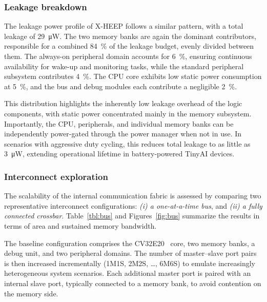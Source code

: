             \vspace{-1em}
            \subsubsection*{Leakage breakdown}
        
                The leakage power profile of \mbox{X-HEEP} follows a similar pattern, with a total leakage of \SI{29}{\micro\watt}. The two memory banks are again the dominant contributors, responsible for a combined \SI{84}{\percent} of the leakage budget, evenly divided between them. The always-on peripheral domain accounts for \SI{6}{\percent}, ensuring continuous availability for wake-up and monitoring tasks, while the standard peripheral subsystem contributes \SI{4}{\percent}. The CPU core exhibits low static power consumption at \SI{5}{\percent}, and the bus and debug modules each contribute a negligible \SI{2}{\percent}.
        
                This distribution highlights the inherently low leakage overhead of the logic components, with static power concentrated mainly in the memory subsystem. Importantly, the CPU, peripherals, and individual memory banks can be independently power-gated through the power manager when not in use. In scenarios with aggressive duty cycling, this reduces total leakage to as little as \SI{3}{\micro\watt}, extending operational lifetime in battery-powered TinyAI devices.

            \vspace{-1em}
            \subsubsection*{Interconnect exploration}
            
                The scalability of the internal communication fabric is assessed by comparing two representative interconnect configurations: \emph{(i) a one-at-a-time bus}, and  
                \emph{(ii) a fully connected crossbar}. Table~\ref{tbl:bus} and Figures~\ref{fig:bus} summarize the results in terms of area and sustained memory bandwidth.
        
                The baseline configuration comprises the CV32E20~\cite{zeroriscy} core, two memory banks, a debug unit, and two peripheral domains. The number of master–slave port pairs is then increased incrementally (1M1S, 2M2S, …, 6M6S) to emulate increasingly heterogeneous system scenarios. Each additional master port is paired with an internal slave port, typically connected to a memory bank, to avoid contention on the memory side.

